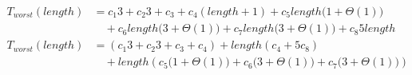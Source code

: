 \begin{subequations}
\label{eq:extendline-1}
\begin{align}
\label{eq:extendline-1-1}
T_{worst}(\mathit{length})& =
c_{1}3
+ c_{2}3
+ c_{3}
+ c_{4}(\mathit{length} + 1)
+ c_{5}\mathit{length} \bigl(1 + \Theta(1)\bigr)
\\
& \quad
+ c_{6}\mathit{length} \bigl(3 + \Theta(1)\bigr)
+ c_{7}\mathit{length} \bigl(3 + \Theta(1)\bigr)
+ c_{8}5\mathit{length}
\nonumber \\
\label{eq:extendline-1-2}
T_{worst}(\mathit{length})& =
(c_{1}3 + c_{2}3 + c_{3} + c_{4})
+ \mathit{length}(c_{4} + 5c_{8})
\\
& \quad
+ \mathit{length}(c_{5}\bigl(1 + \Theta(1)\bigr) + c_{6}\bigl(3 + \Theta(1)\bigr) + c_{7}\bigl(3 + \Theta(1)\bigr))
\nonumber
\end{align}
\end{subequations}
